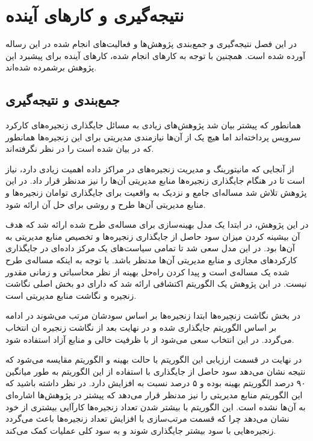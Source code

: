 \chapter{نتیجه‌گیری و کارهای آینده}

در این فصل نتیجه‌گیری و جمع‌بندی پژوهش‌ها و فعالیت‌های انجام شده
در این رساله آورده شده است.
همچنین با توجه به کارهای انجام شده،
کارهای آینده برای پیشبرد این پژوهش برشمرده شده‌اند.

\section{جمع‌بندی و نتیجه‌گیری}

همانطور که پیشتر بیان شد پژوهش‌های زیادی به مسائل جایگذاری
زنجیره‌های کارکرد سرویس پرداخته‌اند
اما هیچ یک از آن‌ها نیازمندی مدیریتی برای این زنجیره‌ها همانطور که در
\cite{ETSI-MAN}
بیان شده است را در نظر نگرفته‌اند.

از آنجایی که مانیتورینگ و مدیریت زنجیره‌های در مراکز داده اهمیت زیادی دارد،
نیاز است تا در هنگام جایگذاری زنجیره‌ها منابع مدیریتی آن‌ها را نیز مدنظر قرار داد.
در این پژوهش تلاش شد مساله‌ای جامع و نزدیک به واقعیت برای جایگذاری توامان زنجیره‌ها و منابع مدیریتی
آن‌ها طرح و روشی برای حل آن ارائه شود.

در این پژوهش، در ابتدا یک مدل بهینه‌سازی
برای مساله‌ی طرح شده ارائه شد که هدف آن بیشینه کردن میزان سود حاصل از جایگذاری زنجیره‌ها
و تخصیص منابع مدیریتی به آن‌ها بود.
در این مدل سعی شد تا تمامی سیاست‌های یک مرکز داده‌ای در جایگذاری کارکردهای مجازی
و منابع مدیریتی آن‌ها مدنظر باشد.
با توجه به اینکه مساله‌ی طرح شده یک مساله‌ی 
است و پیدا کردن راه‌حل بهینه از نظر محاسباتی
و زمانی مقدور نیست.
در این پژوهش یک الگوریتم اکتشافی ارائه شد که دارای دو بخش اصلی
نگاشت زنجیره و نگاشت منابع مدیریتی است.

در بخش نگاشت زنچیره‌ها ابتدا زنجیره‌ها بر اساس سودشان مرتب می‌شوند
در ادامه بر اساس الگوریتم
\cite{Bari2015}
جایگذاری شده و در نهایت بعد از نگاشت زنجیره
ان انتخاب می‌گردد. در این انتخاب سعی می‌شود از 
با ظرفیت خالی و منابع آزاد استفاده شود.

در نهایت در قسمت ارزیابی این الگوریتم با حالت بهینه و الگوریتم
\cite{Bari2015}
مقایسه می‌شود که نتیجه نشان می‌دهد سود حاصل از جایگذاری با استفاده از این الگوریتم
به طور میانگین ۹۰ درصد الگوریتم بهینه بوده و ۵ درصد نسبت به \cite{Bari2015}
افزایش دارد.
در نظر داشته باشید که این الگوریتم منابع مدیریتی را نیز مدنظر قرار می‌دهد
که پیشتر در پژوهش‌ها اشاره‌ای به آن‌ها نشده است.
این الگوریتم با بیشتر شدن تعداد زنجیره‌ها کارآایی بیشتری از خود نشان می‌دهد
چرا که قسمت مرتب‌سازی با افزایش تعداد زنجیره‌ها باعث می‌گردد زنجیره‌هایی با سود بیشتر جایگذاری شوند و به سود کلی عملیات کمک می‌کند.

